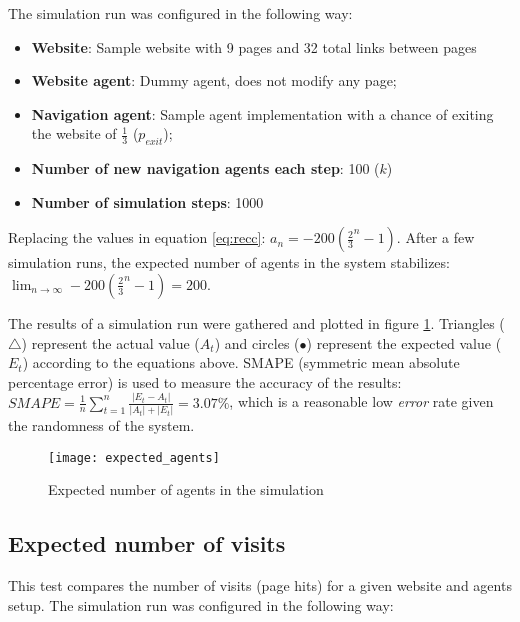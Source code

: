 The simulation run was configured in the following way:

\begin{itemize}
    \item \textbf{Website}: Sample website with 9 pages and 32 total links 
    between pages
    \item \textbf{Website agent}: Dummy agent, does not modify any page;
    \item \textbf{Navigation agent}: Sample agent implementation with a chance 
    of exiting the website of $\frac{1}{3}$ ($p_{exit}$);
    \item \textbf{Number of new navigation agents each step}: 100 ($k$)
    \item \textbf{Number of simulation steps}: 1000
\end{itemize}

Replacing the values in equation \ref{eq:recc}: $a_{n} = -200 \left ( 
\frac{2}{3}^{n} - 1 \right )$. After a few simulation runs, the expected number 
of agents in the system stabilizes: $\lim_{n\to \infty} -200 \left ( 
\frac{2}{3}^{n} - 1 \right ) = 200$.

The results of a simulation run were gathered and plotted in figure 
\ref{fig:expagents}. Triangles ($\triangle$) represent the actual value 
($A_{t}$) and circles ($\bullet$) represent the expected value ($E_{t}$) 
according to the equations above. SMAPE (symmetric mean absolute percentage 
error)\cite{makridakis1993accuracy} is used to measure the accuracy of the 
results: $ SMAPE = {\frac {1}{n}}\sum _{t=1}^{n}{\frac 
{\left|E_{t}-A_{t}\right|}{|A_{t}|+|E_{t}|}} = 3.07\% $, which is a reasonable 
low \textit{error} rate given the randomness of the system.

\begin{figure}[h]
    \begin{center}
        \leavevmode
        \texttt{[image: expected\_agents]}
        \caption{Expected number of agents in the simulation}
        \label{fig:expagents}
    \end{center}
\end{figure}

\subsection{Expected number of visits}

This test compares the number of visits (page hits) for a given website and 
agents setup. The simulation run was configured in the following way:

